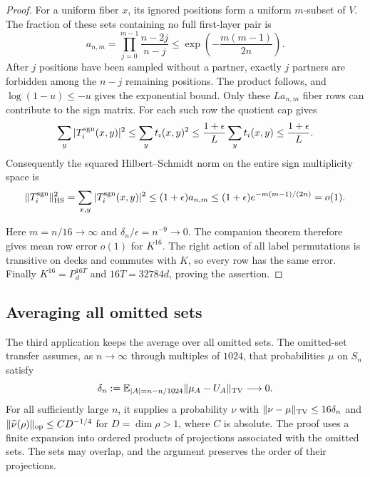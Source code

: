 \begin{proof}
For a uniform fiber $x$, its ignored positions form a uniform
$m$-subset of $V$. The fraction of these sets containing no full
first-layer pair is
\[
 a_{n,m}=\prod_{j=0}^{m-1}\frac{n-2j}{n-j}
 \le\exp\left(-\frac{m(m-1)}{2n}\right).
\]
After $j$ positions have been sampled without a partner, exactly $j$
partners are forbidden among the $n-j$ remaining positions. The product
follows, and $\log(1-u)\le-u$ gives the exponential bound.
Only these $La_{n,m}$ fiber rows can contribute to the sign matrix.
For each such row the quotient cap gives
\[
 \sum_y|T_i^{\operatorname{sgn}}(x,y)|^2
 \le\sum_y t_i(x,y)^2
 \le\frac{1+\epsilon}{L}\sum_y t_i(x,y)
 \le\frac{1+\epsilon}{L}.
\]
Consequently the squared Hilbert--Schmidt norm on the entire sign
multiplicity space is
\[
 \|T_i^{\operatorname{sgn}}\|_{\mathrm{HS}}^2
 =\sum_{x,y}|T_i^{\operatorname{sgn}}(x,y)|^2
 \le(1+\epsilon)a_{n,m}
 \le(1+\epsilon)e^{-m(m-1)/(2n)}=o(1).
\]

Here $m=n/16\to\infty$ and $\delta_n/\epsilon=n^{-9}\to0$.
The companion theorem therefore gives mean row error $o(1)$ for
$K^{16}$. The right action of all label permutations is transitive
on decks and commutes with $K$, so every row has the same error.
Finally $K^{16}=P_d^{16T}$ and $16T=32784d$, proving the assertion.
\end{proof}

\subsection{Averaging all omitted sets}

The third application keeps the average over all omitted sets.
The omitted-set transfer
\cite[Theorem~]{partial-fourier}
assumes, as $n\to\infty$ through multiples of $1024$, that probabilities
$\mu$ on $S_n$ satisfy
\[
 \delta_n:=\mathbb E_{|A|=n-n/1024}
       \|\mu_A-U_A\|_{\mathrm{TV}}\longrightarrow0.
\]
For all sufficiently large $n$, it supplies a probability $\nu$ with
$\|\nu-\mu\|_{\mathrm{TV}}\le16\delta_n$ and
$\|\widehat\nu(\rho)\|_{\mathrm{op}}\le CD^{-1/4}$ for $D=\dim\rho>1$,
where $C$ is absolute. The proof uses a finite expansion into ordered
products of projections associated with the omitted sets. The sets may overlap,
and the argument preserves the order of their projections.

